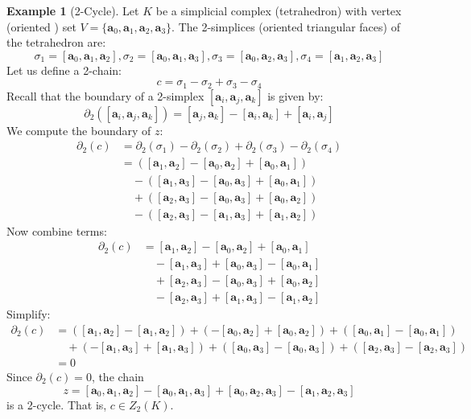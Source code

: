 \documentclass[12pt,oneside,reqno]{amsart}
\theoremstyle{plain}
\theoremstyle{definition}
\newtheorem{example}{Example}[section]
\theoremstyle{remark}
\newcommand{\btext}[1]{\mathbf{#1}}
\newcommand{\0}{{\textbf{0}}}
\begin{document}
\begin{example}[2-Cycle]\label{eq:2 Cycle}
Let $K$ be a simplicial complex (tetrahedron) with vertex (oriented ) set $V = \{\btext{a}_0, \btext{a}_1, \btext{a}_2, \btext{a}_3\}$. The 2-simplices (oriented triangular faces) of the tetrahedron are:
\[\sigma_1 = [\btext{a}_0, \btext{a}_1, \btext{a}_2],
\sigma_2 = [\btext{a}_0, \btext{a}_1, \btext{a}_3],
\sigma_3 = [\btext{a}_0, \btext{a}_2, \btext{a}_3],
\sigma_4 = [\btext{a}_1, \btext{a}_2, \btext{a}_3]\]
Let us define a 2-chain:
\[
c = \sigma_1 - \sigma_2 + \sigma_3 - \sigma_4
\]
Recall that the boundary of a 2-simplex $[\btext{a}_i, \btext{a}_j, \btext{a}_k]$ is given by:
\[
\partial_2([\btext{a}_i, \btext{a}_j, \btext{a}_k]) = [\btext{a}_j, \btext{a}_k] - [\btext{a}_i, \btext{a}_k] + [\btext{a}_i, \btext{a}_j]
\]
We compute the boundary of $z$:
\begin{align*}
\partial_2(c) &= \partial_2(\sigma_1) - \partial_2(\sigma_2) + \partial_2(\sigma_3) - \partial_2(\sigma_4) \\
&= \left( [\btext{a}_1, \btext{a}_2] - [\btext{a}_0, \btext{a}_2] + [\btext{a}_0, \btext{a}_1] \right) \\
&\quad - \left( [\btext{a}_1, \btext{a}_3] - [\btext{a}_0, \btext{a}_3] + [\btext{a}_0, \btext{a}_1] \right) \\
&\quad + \left( [\btext{a}_2, \btext{a}_3] - [\btext{a}_0, \btext{a}_3] + [\btext{a}_0, \btext{a}_2] \right) \\
&\quad - \left( [\btext{a}_2, \btext{a}_3] - [\btext{a}_1, \btext{a}_3] + [\btext{a}_1, \btext{a}_2] \right)
\end{align*}
Now combine terms:
\begin{align*}
\partial_2(c) &= [\btext{a}_1, \btext{a}_2] - [\btext{a}_0, \btext{a}_2] + [\btext{a}_0, \btext{a}_1] \\
&\quad - [\btext{a}_1, \btext{a}_3] + [\btext{a}_0, \btext{a}_3] - [\btext{a}_0, \btext{a}_1] \\
&\quad + [\btext{a}_2, \btext{a}_3] - [\btext{a}_0, \btext{a}_3] + [\btext{a}_0, \btext{a}_2] \\
&\quad - [\btext{a}_2, \btext{a}_3] + [\btext{a}_1, \btext{a}_3] - [\btext{a}_1, \btext{a}_2]
\end{align*}
Simplify:
\begin{align*}
\partial_2(c) &= \left( [\btext{a}_1, \btext{a}_2] - [\btext{a}_1, \btext{a}_2] \right)
+ \left( -[\btext{a}_0, \btext{a}_2] + [\btext{a}_0, \btext{a}_2] \right)
+ \left( [\btext{a}_0, \btext{a}_1] - [\btext{a}_0, \btext{a}_1] \right) \\
&\quad + \left( -[\btext{a}_1, \btext{a}_3] + [\btext{a}_1, \btext{a}_3] \right)
+ \left( [\btext{a}_0, \btext{a}_3] - [\btext{a}_0, \btext{a}_3] \right)
+ \left( [\btext{a}_2, \btext{a}_3] - [\btext{a}_2, \btext{a}_3] \right) \\
&= 0
\end{align*}
Since $\partial_2(c) = 0$, the chain
\[
z = [\btext{a}_0, \btext{a}_1, \btext{a}_2] - [\btext{a}_0, \btext{a}_1, \btext{a}_3] + [\btext{a}_0, \btext{a}_2, \btext{a}_3] - [\btext{a}_1, \btext{a}_2, \btext{a}_3]
\]
is a 2-cycle. That is, $c \in Z_2(K)$.
\end{example}
\end{document}
